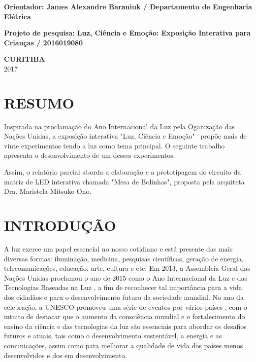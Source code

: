 \documentclass[a4paper,12pt]{article}
\begin{document}
\begin{titlepage}
\begin{center}
      \begin{flushleft}

      \textbf{Orientador: James Alexandre Baraniuk / Departamento de Engenharia Elétrica}\\[0.5cm]
      \raggedright \textbf{Projeto de pesquisa: Luz, Ciência e Emoção: Exposição Interativa para Crianças / 2016019080}\\[0.7cm]

      \end{flushleft}

      {\textbf{CURITIBA}}\\
      {2017}


    \end{center}
  \end{titlepage}

  \tableofcontents

  \clearpage
  \section{RESUMO}
  Inspirada na proclamação do Ano Internacional da Luz pela Oganização das Nações Unidas, a exposição interativa "Luz, Ciência e Emoção" \ propõe mais de vinte experimentos tendo a luz como tema principal. O seguinte trabalho apresenta o desenvolvimento de um desses experimentos.
  
  Assim, o relatório parcial aborda a elaboração e a prototipagem do circuito da matriz de LED interativa chamada "Mesa de Bolinhas", proposta pela arquiteta Dra. Maristela Mitsuko Ono.

  \clearpage
  \section{INTRODUÇÃO}
 
  A luz exerce um papel essencial no nosso cotidiano e está presente das mais diversas formas: iluminação, medicina, pesquisas científicas, geração de energia, telecomunicações, educação, arte, cultura e etc. Em 2013, a Assembleia Geral das Nações Unidas proclamou o ano de 2015 como o Ano Internacional da Luz e das Tecnologias Baseadas na Luz \cite{resolucao-onu}, a fim de reconhecer tal importância para a vida dos cidadãos e para o desenvolvimento futuro da sociedade mundial. No ano da celebração, a UNESCO promoveu uma série de eventos por vários países \cite{eventos-unesco}, com o intuito de destacar que o aumento da consciência mundial e o fortalecimento do ensino da ciência e das tecnologias da luz são essenciais para abordar os desafios futuros e atuais, tais como o desenvolvimento sustentável, a energia e as comunicações, assim como para melhorar a qualidade de vida dos países menos desenvolvidos e dos em desenvolvimento.
  
\end{document}

